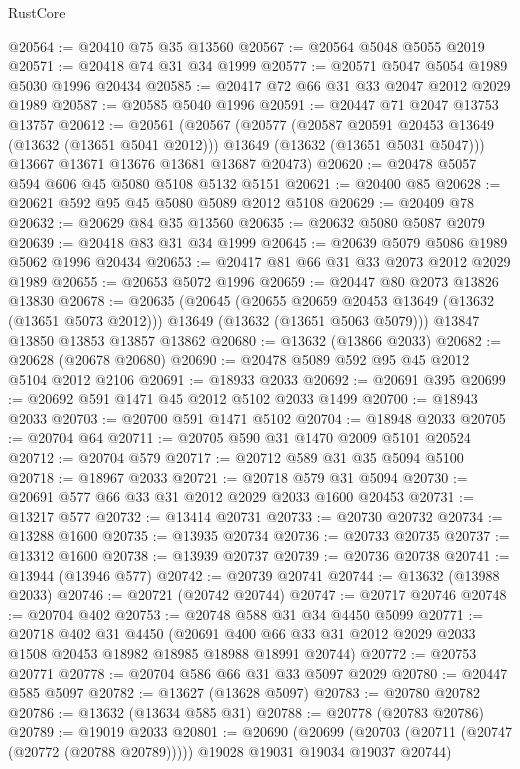 \begin{lexlean}{RustCore}
\begin{coremodule}
@20564 := @20410 @75 @35 @13560
@20567 := @20564 @5048 @5055 @2019
@20571 := @20418 @74 @31 @34 @1999
@20577 := @20571 @5047 @5054 @1989 @5030 @1996 @20434
@20585 := @20417 @72 @66 @31 @33 @2047 @2012 @2029 @1989
@20587 := @20585 @5040 @1996
@20591 := @20447 @71 @2047 @13753 @13757
@20612 := @20561
    (@20567
      (@20577
        (@20587 @20591 @20453 @13649 (@13632 (@13651 @5041 @2012)))
        @13649
        (@13632 (@13651 @5031 @5047)))
      @13667
      @13671
      @13676
      @13681
      @13687
      @20473)
@20620 := @20478 @5057 @594 @606 @45 @5080 @5108 @5132 @5151
@20621 := @20400 @85
@20628 := @20621 @592 @95 @45 @5080 @5089 @2012 @5108
@20629 := @20409 @78
@20632 := @20629 @84 @35 @13560
@20635 := @20632 @5080 @5087 @2079
@20639 := @20418 @83 @31 @34 @1999
@20645 := @20639 @5079 @5086 @1989 @5062 @1996 @20434
@20653 := @20417 @81 @66 @31 @33 @2073 @2012 @2029 @1989
@20655 := @20653 @5072 @1996
@20659 := @20447 @80 @2073 @13826 @13830
@20678 := @20635
    (@20645
      (@20655 @20659 @20453 @13649 (@13632 (@13651 @5073 @2012)))
      @13649
      (@13632 (@13651 @5063 @5079)))
    @13847
    @13850
    @13853
    @13857
    @13862
@20680 := @13632 (@13866 @2033)
@20682 := @20628 (@20678 @20680)
@20690 := @20478 @5089 @592 @95 @45 @2012 @5104 @2012 @2106
@20691 := @18933 @2033
@20692 := @20691 @395
@20699 := @20692 @591 @1471 @45 @2012 @5102 @2033 @1499
@20700 := @18943 @2033
@20703 := @20700 @591 @1471 @5102
@20704 := @18948 @2033
@20705 := @20704 @64
@20711 := @20705 @590 @31 @1470 @2009 @5101 @20524
@20712 := @20704 @579
@20717 := @20712 @589 @31 @35 @5094 @5100
@20718 := @18967 @2033
@20721 := @20718 @579 @31 @5094
@20730 := @20691 @577 @66 @33 @31 @2012 @2029 @2033 @1600 @20453
@20731 := @13217 @577
@20732 := @13414 @20731
@20733 := @20730 @20732
@20734 := @13288 @1600
@20735 := @13935 @20734
@20736 := @20733 @20735
@20737 := @13312 @1600
@20738 := @13939 @20737
@20739 := @20736 @20738
@20741 := @13944 (@13946 @577)
@20742 := @20739 @20741
@20744 := @13632 (@13988 @2033)
@20746 := @20721 (@20742 @20744)
@20747 := @20717 @20746
@20748 := @20704 @402
@20753 := @20748 @588 @31 @34 @4450 @5099
@20771 := @20718
    @402
    @31
    @4450
    (@20691 @400 @66 @33 @31 @2012 @2029 @2033 @1508 @20453 @18982 @18985 @18988 @18991 @20744)
@20772 := @20753 @20771
@20778 := @20704 @586 @66 @31 @33 @5097 @2029
@20780 := @20447 @585 @5097
@20782 := @13627 (@13628 @5097)
@20783 := @20780 @20782
@20786 := @13632 (@13634 @585 @31)
@20788 := @20778 (@20783 @20786)
@20789 := @19019 @2033
@20801 := @20690
    (@20699 (@20703 (@20711 (@20747 (@20772 (@20788 @20789))))) @19028 @19031 @19034 @19037 @20744)

\end{coremodule}
\end{lexlean}
